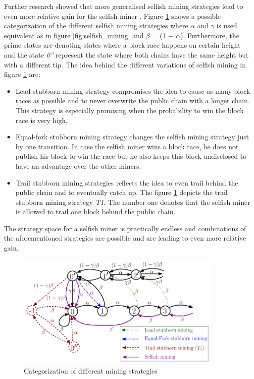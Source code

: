 \documentclass{scrartcl}
\begin{document}
Further research showed that more generalised selfish mining strategies lead to even more relative gain for the selfish miner \cite{nayak2016stubborn,sapirshtein2016optimal, gervais2015tampering, gervais2016security, bahack2013theoretical}. Figure \ref{fig:stubborn_mining} shows a possible categorization of the different selfish mining strategies where $\alpha$ and $\gamma$ is used equivalent as in figure \ref{fig:selfish_mining} and $\beta$ = (1 − $\alpha$). Furthermore, the prime states are denoting states where a block race happens on certain height and the state \textit{0''} represent the state where both chains have the same height but with a different tip. The idea behind the different variations of selfish mining in figure \ref{fig:stubborn_mining} are:
\begin{itemize}
\item Lead stubborn mining strategy compromises the idea to cause as many block races as possible and to never overwrite the public chain with a longer chain. This strategy is especially promising when the probability to win the block race is very high.
\item Equal-fork stubborn mining strategy changes the selfish mining strategy just by one transition. In case the selfish miner wins a block race, he does not publish his block to win the race but he also keeps this block undisclosed to have an advantage over the other miners.
\item Trail stubborn mining strategies reflects the idea to even trail behind the public chain and to eventually catch up. The figure \ref{fig:stubborn_mining} depicts the trail stubborn mining strategy \textit{T1}. The number one denotes that the selfish miner is allowed to trail one block behind the public chain.
\end{itemize}

The strategy space for a selfish miner is practically endless and combinations of the aforementioned strategies are possible and are leading to even more relative gain. \cite{nayak2016stubborn,sapirshtein2016optimal, gervais2015tampering, gervais2016security, bahack2013theoretical}


\begin{figure}[t]
\includegraphics[width=10cm]{figures/stubborn_mining}
\centering
\caption{Categorization of different mining strategies \cite{nayak2016stubborn}}
\label{fig:stubborn_mining}
\end{figure}
\end{document}
